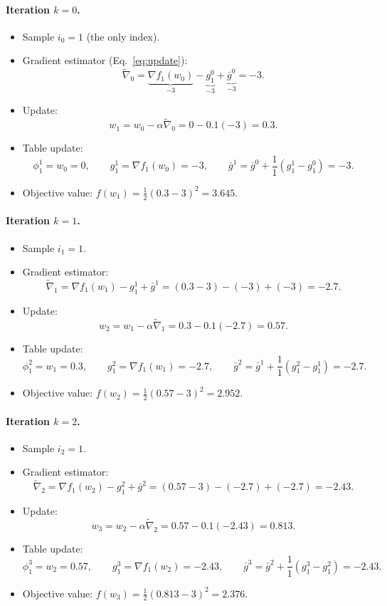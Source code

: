 \documentclass{article}
\begin{document}
\paragraph{Iteration $k=0$.}
\begin{itemize}
\item Sample $i_0=1$ (the only index).
\item Gradient estimator (Eq.~\eqref{eq:update}):
\[
\tilde\nabla_0 = \underbrace{\nabla f_1(w_0)}_{-3}
               -\underbrace{g_1^0}_{-3}
               +\underbrace{\bar g^0}_{-3}= -3.
\]
\item Update:
\[
w_1 = w_0-\alpha\tilde\nabla_0 = 0-0.1(-3)=0.3.
\]
\item Table update:
\[
\phi_1^{1}=w_0=0,\qquad g_1^{1}= \nabla f_1(w_0)=-3,\qquad 
\bar g^{1}= \bar g^{0}+\frac{1}{1}(g_1^{1}-g_1^{0})=-3.
\]
\item Objective value: $f(w_1)=\tfrac12(0.3-3)^2=3.645$.
\end{itemize}

\paragraph{Iteration $k=1$.}
\begin{itemize}
\item Sample $i_1=1$.
\item Gradient estimator:
\[
\tilde\nabla_1 = \nabla f_1(w_1)-g_1^{1}+\bar g^{1}
               = (0.3-3)-(-3)+(-3)= -2.7.
\]
\item Update:
\[
w_2 = w_1-\alpha\tilde\nabla_1 = 0.3-0.1(-2.7)=0.57.
\]
\item Table update:
\[
\phi_1^{2}=w_1=0.3,\qquad g_1^{2}= \nabla f_1(w_1)=-2.7,\qquad
\bar g^{2}= \bar g^{1}+\frac{1}{1}(g_1^{2}-g_1^{1})=-2.7.
\]
\item Objective value: $f(w_2)=\tfrac12(0.57-3)^2=2.952$.
\end{itemize}

\paragraph{Iteration $k=2$.}
\begin{itemize}
\item Sample $i_2=1$.
\item Gradient estimator:
\[
\tilde\nabla_2 = \nabla f_1(w_2)-g_1^{2}+\bar g^{2}
               = (0.57-3)-(-2.7)+(-2.7)= -2.43.
\]
\item Update:
\[
w_3 = w_2-\alpha\tilde\nabla_2 = 0.57-0.1(-2.43)=0.813.
\]
\item Table update:
\[
\phi_1^{3}=w_2=0.57,\qquad g_1^{3}= \nabla f_1(w_2)=-2.43,\qquad
\bar g^{3}= \bar g^{2}+\frac{1}{1}(g_1^{3}-g_1^{2})=-2.43.
\]
\item Objective value: $f(w_3)=\tfrac12(0.813-3)^2=2.376$.
\end{itemize}
\end{document}
